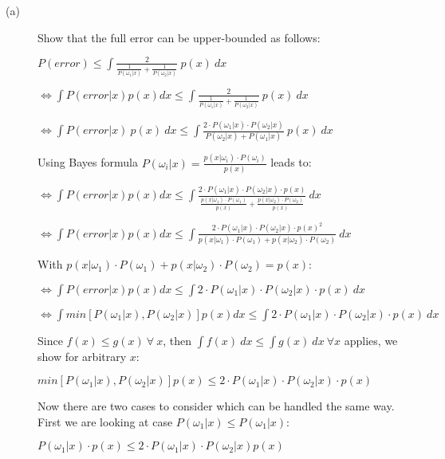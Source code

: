 \documentclass{article}
\begin{document}
\begin{description}
\item[(a)] Show that the full error can be upper-bounded as follows:

$P(error) \leq \int \frac{2}{\frac{1}{P(\omega_1|x)} + \frac{1}{P(\omega_2|x)}}\ p(x)\ dx$

$\Leftrightarrow \int P(error|x)p(x)dx \leq \int \frac{2}{\frac{1}{P(\omega_1|x)} + \frac{1}{P(\omega_2|x)}}\ p(x)\ dx$

$\Leftrightarrow \int P(error|x)\ p(x)\ dx \leq \int \frac{2 \cdot P(\omega_1|x) \cdot P(\omega_2|x) }{P(\omega_2|x) + P(\omega_1|x)}\ p(x)\ dx$

\vspace{0.3cm}
Using Bayes formula $P(\omega_i|x) = \frac{p(x|\omega_i) \cdot P(\omega_i)}{p(x)}$ leads to:
\vspace{0.3cm}

$\Leftrightarrow \int P(error|x)p(x)dx \leq \int \frac{2 \cdot P(\omega_1|x) \cdot P(\omega_2|x) \cdot p(x) }{\frac{p(x|\omega_1) \cdot P(\omega_1)}{p(x)} + \frac{p(x|\omega_2) \cdot P(\omega_2)}{p(x)}}\ dx$

$\Leftrightarrow \int P(error|x)p(x)dx \leq \int \frac{2 \cdot P(\omega_1|x) \cdot P(\omega_2|x) \cdot p(x)^2 }{p(x|\omega_1) \cdot P(\omega_1) + p(x|\omega_2) \cdot P(\omega_2)}\ dx$

\vspace{0.3cm}
With $p(x|\omega_1) \cdot P(\omega_1) + p(x|\omega_2) \cdot P(\omega_2) = p(x)$:
\vspace{0.3cm}

$\Leftrightarrow \int P(error|x)p(x)dx \leq \int 2 \cdot P(\omega_1|x) \cdot P(\omega_2|x) \cdot p(x)\ dx$

$\Leftrightarrow \int min[P(\omega_1|x), P(\omega_2|x)]p(x)dx \leq \int 2 \cdot P(\omega_1|x) \cdot P(\omega_2|x) \cdot p(x)\ dx$

\vspace{0.3cm}
Since $f(x) \leq g(x)\  \forall \  x$, then $\int f(x)\ dx \leq \int g(x)\  dx \  \forall x$ applies, we show for arbitrary $x$:

$min[P(\omega_1|x), P(\omega_2|x)]p(x) \leq 2 \cdot P(\omega_1|x) \cdot P(\omega_2|x) \cdot p(x)$

\vspace{0.3cm}
Now there are two cases to consider which can be handled the same way. First we are looking at case $ P(\omega_1|x) \leq P(\omega_1|x)$:

\vspace{0.3cm}
$P(\omega_1|x) \cdot p(x) \leq 2 \cdot P(\omega_1|x) \cdot P(\omega_2|x) p(x) $


\end{description}
\end{document}
